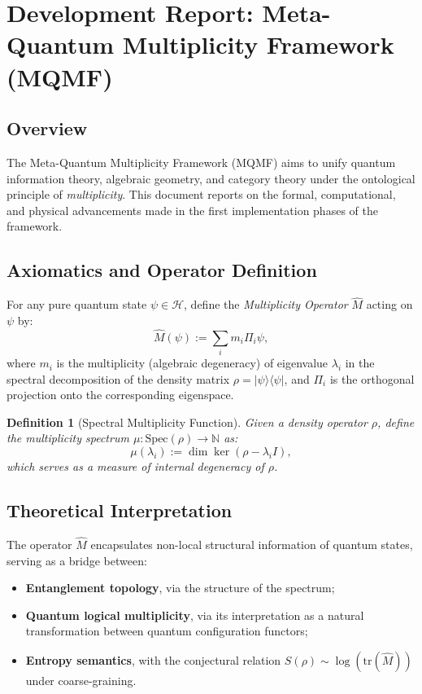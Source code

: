 \documentclass[12]{amsart}
\theoremstyle{plain}
\newtheorem{definition}[theorem]{Definition}
\begin{document}
\section{Development Report: Meta-Quantum Multiplicity Framework (MQMF)}

\subsection{Overview}
The Meta-Quantum Multiplicity Framework (MQMF) aims to unify quantum information theory, algebraic geometry, and category theory under the ontological principle of \emph{multiplicity}. This document reports on the formal, computational, and physical advancements made in the first implementation phases of the framework.

\subsection{Axiomatics and Operator Definition}

\begin{axiom}
For any pure quantum state $\psi \in \mathcal{H}$, define the \emph{Multiplicity Operator} $\hat{M}$ acting on $\psi$ by:
\[
\hat{M}(\psi) := \sum_{i} m_i \Pi_i \psi,
\]
where $m_i$ is the multiplicity (algebraic degeneracy) of eigenvalue $\lambda_i$ in the spectral decomposition of the density matrix $\rho = |\psi\rangle\langle\psi|$, and $\Pi_i$ is the orthogonal projection onto the corresponding eigenspace.
\end{axiom}

\begin{definition}[Spectral Multiplicity Function]
Given a density operator $\rho$, define the multiplicity spectrum $\mu: \text{Spec}(\rho) \rightarrow \mathbb{N}$ as:
\[
\mu(\lambda_i) := \dim \ker(\rho - \lambda_i I),
\]
which serves as a measure of internal degeneracy of $\rho$.
\end{definition}

\subsection{Theoretical Interpretation}
The operator $\hat{M}$ encapsulates non-local structural information of quantum states, serving as a bridge between:
\begin{itemize}
  \item \textbf{Entanglement topology}, via the structure of the spectrum;
  \item \textbf{Quantum logical multiplicity}, via its interpretation as a natural transformation between quantum configuration functors;
  \item \textbf{Entropy semantics}, with the conjectural relation $S(\rho) \sim \log(\mathrm{tr}(\hat{M}))$ under coarse-graining.
\end{itemize}
\end{document}
